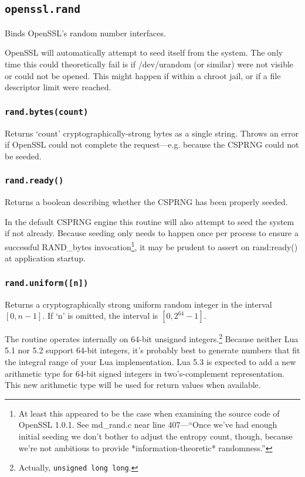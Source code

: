 \documentclass[11pt, oneside]{memoir}
\newcommand*{\fn}[1]{\texttt{#1}\xspace}
\newcounter{toccols}
\newenvironment{Module}[1]{
	\subsection{\texttt{#1}}
	\addtocontents{toc}{
		\protect\begin{multicols}{\value{toccols}}
	}
}{
	\addtocontents{toc}{\protect\end{multicols}}
}
\begin{document}
\begin{Module}{openssl.rand}

Binds OpenSSL's random number interfaces.

OpenSSL will automatically attempt to seed itself from the system. The only time this could theoretically fail is if /dev/urandom (or similar) were not visible or could not be opened. This might happen if within a chroot jail, or if a file descriptor limit were reached.

\subsubsection[\fn{rand.bytes}]{\fn{rand.bytes(count)}}

Returns `count' cryptographically-strong bytes as a single string. Throws an error if OpenSSL could  not complete the request---e.g. because the CSPRNG could not be seeded.

\subsubsection[\fn{rand.ready}]{\fn{rand.ready()}}

Returns a boolean describing whether the CSPRNG has been properly seeded.

In the default CSPRNG engine this routine will also attempt to seed the system if not already. Because seeding only needs to happen once per process to ensure a successful RAND\_bytes invocation\footnote{At least this appeared to be the case when examining the source code of OpenSSL 1.0.1. See md\_rand.c near line 407---``Once we've had enough initial seeding we don't bother to adjust the entropy count, though, because we're not ambitious to provide *information-theoretic* randomness.''}, it may be prudent to assert on rand:ready() at application startup.

\subsubsection[\fn{rand.uniform}]{\fn{rand.uniform([n])}}

Returns a cryptographically strong uniform random integer in the interval $[0, n-1]$. If `n' is omitted, the interval is $[0, 2^{64}-1]$.

The routine operates internally on 64-bit unsigned integers.\footnote{Actually, \texttt{unsigned long long}.} Because neither Lua 5.1 nor 5.2 support 64-bit integers, it's probably best to generate numbers that fit the integral range of your Lua implementation. Lua 5.3 is expected to add a new arithmetic type for 64-bit signed integers in two's-complement representation. This new arithmetic type will be used for return values when available.

\end{Module}
\end{document}
